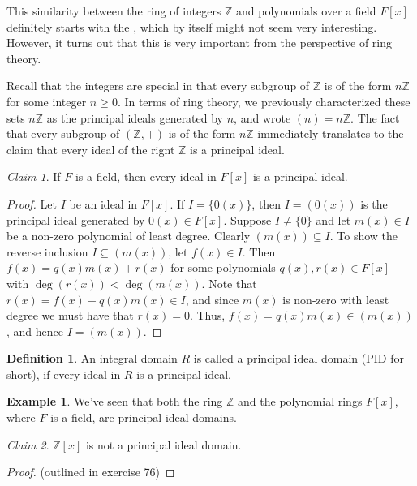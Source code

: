 \documentclass[12pt,letterpaper,DIV=11,final]{scrartcl}
\theoremstyle{plain}
\theoremstyle{definition}
\newtheorem{definition}{Definition}[section]
\newtheorem{example}{Example}[section]
\theoremstyle{remark}
\newtheorem{claim}{Claim}
\begin{document}
This similarity between the ring of integers $\mathbb{Z}$ and polynomials over a field $F[x]$ definitely starts with the , which by itself might not seem very interesting.
However, it turns out that this is very important from the perspective of ring theory.

Recall that the integers are special in that every subgroup of $\mathbb{Z}$ is of the form $n \mathbb{Z}$ for some integer $n \geq 0$.
In terms of ring theory, we previously characterized these sets $n \mathbb{Z}$ as the principal ideals generated by $n$, and wrote $(n) = n \mathbb{Z}$.
The fact that every subgroup of $(\mathbb{Z}, +)$ is of the form $n \mathbb{Z}$ immediately translates to the claim that every ideal of the rignt $\mathbb{Z}$ is a principal ideal.

\begin{claim}
  If $F$ is a field, then every ideal in $F[x]$ is a principal ideal.

  \begin{proof}
    Let $I$ be an ideal in $F[x]$.
    If $I = \{ 0(x) \}$, then $I = \left( 0(x) \right)$ is the principal ideal generated by $0(x) \in F[x]$.
    Suppose $I \neq \{ 0 \}$ and let $m(x) \in I$ be a non-zero polynomial of least degree.
    Clearly $\left( m(x) \right) \subseteq I$.
    To show the reverse inclusion $I \subseteq \left( m(x) \right)$, let $f(x) \in I$.
    Then $f(x) = q(x) m(x) + r(x)$ for some polynomials $q(x), r(x) \in F[x]$ with $\deg(r(x)) < \deg(m(x))$.
    Note that $r(x) = f(x) - q(x) m(x) \in I$, and since $m(x)$ is non-zero with least degree we must have that $r(x) = 0$.
    Thus, $f(x) = q(x) m(x) \in \left( m(x) \right)$, and hence $I = \left( m(x) \right)$.
  \end{proof}
\end{claim}

\begin{definition}
  An integral domain $R$ is called a principal ideal domain (PID for short), if every ideal in $R$ is a principal ideal.
\end{definition}

\begin{example}
  We've seen that both the ring $\mathbb{Z}$ and the polynomial rings $F[x]$, where $F$ is a field, are principal ideal domains.
\end{example}

\begin{claim}
  $\mathbb{Z}[x]$ is not a principal ideal domain.

  \begin{proof}
    (outlined in exercise 76)
  \end{proof}
\end{claim}
\end{document}

